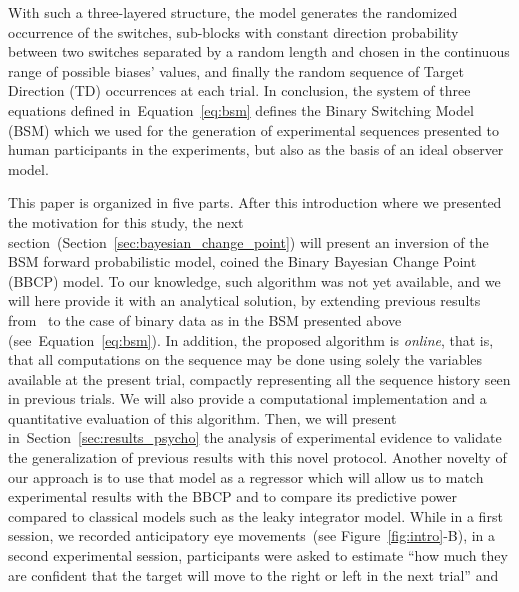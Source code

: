 \documentclass[12pt,english]{article}%
\newcommand{\citet}[1]{\textcite{#1}}
\newcommand{\seeFig}[1]{Figure~\ref{fig:#1}}
\newcommand{\seeEq}[1]{Equation~\ref{eq:#1}}
\newcommand{\seeSec}[1]{Section~\ref{sec:#1}}
\begin{document}
With such a three-layered structure, the model generates the randomized occurrence of the switches,
sub-blocks with constant direction probability between two switches separated by a random length
and chosen in the continuous range of possible biases' values,
and finally the random sequence of Target Direction (TD) occurrences at each trial.
In conclusion, the system of three equations defined in~\seeEq{bsm}
defines the Binary Switching Model (BSM)
which we used for the generation of experimental sequences presented to human participants in the experiments,
but also as the basis of an ideal observer model.

This paper is organized in five parts.
After this introduction where we presented the motivation for this study,
the next section~(\seeSec{bayesian_change_point}) will present
an inversion of the BSM forward probabilistic model,
coined the Binary Bayesian Change Point (BBCP) model.
To our knowledge, such algorithm was not yet available, and
we will here provide it with an analytical solution,
by extending previous results from~\citet{AdamsMackay2007}
to the case of binary data as in the BSM presented above (see~\seeEq{bsm}).
In addition, the proposed algorithm is \emph{online},
that is, that all computations on the sequence may be done
using solely the variables available at the present trial,
compactly representing all the sequence history seen in previous trials.
We will also provide a computational implementation
and a quantitative evaluation of this algorithm.
Then, we will present in~\seeSec{results_psycho} the analysis of experimental evidence
to validate the generalization of previous results %
with this novel protocol. %
Another novelty of our approach is to use that model as a regressor
which will allow us to match experimental results with the BBCP
and to compare its predictive power compared to classical models such as the leaky integrator model.
While in a first session, we recorded anticipatory eye movements~(see \seeFig{intro}-B),
in a second experimental session, participants were asked to estimate
``how much they are confident that
the target will move to the right or left in the next trial'' and
\end{document}
